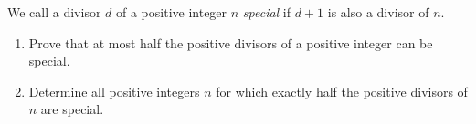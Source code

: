 We call a divisor $d$ of a positive integer $n$ \emph{special} if $d+1$ is also a divisor of $n$.

\begin{enumerate}[label=(\alph*)]
	\item Prove that at most half the positive divisors of a positive integer can be special.
	\item Determine all positive integers $n$ for which exactly half the positive divisors of $n$ are special.
\end{enumerate}